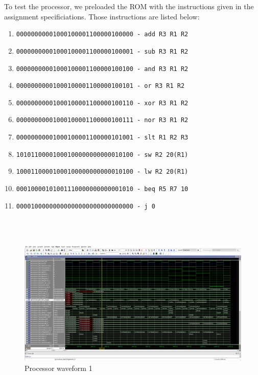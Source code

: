 \documentclass{article}
\begin{document}
To test the processor, we preloaded the ROM with the instructions given in the assignment specificiations. Those instructions are listed below: 
\begin{enumerate}
	\item \texttt{00000000001000100001100000100000 - add R3 R1 R2} 
	\item \texttt{00000000001000100001100000100001 - sub R3 R1 R2} 
	\item \texttt{00000000001000100001100000100100 - and R3 R1 R2} 
	\item \texttt{00000000001000100001100000100101 - or R3 R1 R2}
	\item \texttt{00000000001000100001100000100110 - xor R3 R1 R2}
	\item \texttt{00000000001000100001100000100111 - nor R3 R1 R2}
	\item \texttt{00000000001000100001100000101001 - slt R1 R2 R3}
	\item \texttt{10101100001000100000000000010100 - sw R2 20(R1)}
	\item \texttt{10001100001000100000000000010100 - lw R2 20(R1)}
	\item \texttt{00010000101001110000000000001010 - beq R5 R7 10}
	\item \texttt{00001000000000000000000000000000 - j 0}
\end{enumerate}

\\ \\
\begin{figure}[!ht]
	\centering
		\includegraphics[width=1\textwidth]{processor_waveform1.png}
		\caption{Processor waveform 1}
\end{figure}
\\ \\
\end{document}
